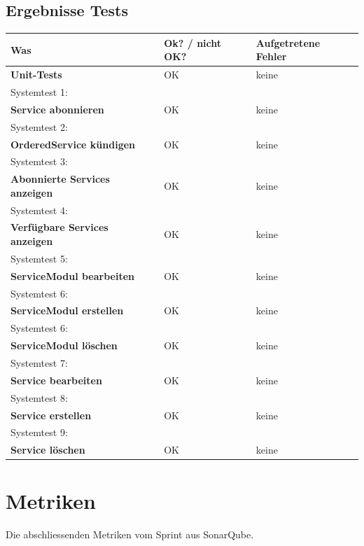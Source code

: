 \subsection{Ergebnisse Tests}
\begin{tabularx}{\linewidth}{X l l}
\textbf{Was} & \textbf{Ok? / nicht OK?} & \textbf{Aufgetretene Fehler}\\
\hline
\textbf{Unit-Tests} & {\color{green} OK}  & keine\\
\hline
Systemtest 1: & & \\
\textbf{Service abonnieren} & {\color{green} OK} & keine\\
\hline
Systemtest 2: & & \\
\textbf{OrderedService kündigen} & {\color{green} OK}  & keine\\
\hline
Systemtest 3: & & \\
\textbf{Abonnierte Services anzeigen} & {\color{green} OK}  & keine\\
\hline
Systemtest 4: & & \\
\textbf{Verfügbare Services anzeigen} & {\color{green} OK}  & keine\\
\hline
Systemtest 5: & & \\
\textbf{ServiceModul bearbeiten} & {\color{green} OK}  & keine\\
\hline
Systemtest 6: & & \\
\textbf{ServiceModul erstellen} & {\color{green} OK}  & keine\\
\hline
Systemtest 6: & & \\
\textbf{ServiceModul löschen} & {\color{green} OK}  & keine\\
\hline
Systemtest 7: & & \\
\textbf{Service bearbeiten} & {\color{green} OK}  & keine\\
\hline
Systemtest 8: & & \\
\textbf{Service erstellen} & {\color{green} OK}  & keine\\
\hline
Systemtest 9: & & \\
\textbf{Service löschen} & {\color{green} OK}  & keine\\
\hline


\end{tabularx}

\newpage

\section{Metriken}
Die abschliessenden Metriken vom Sprint aus SonarQube.
